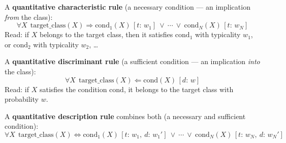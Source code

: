 \documentclass[11pt,a4paper]{article}
\theoremstyle{definition}
\begin{document}
\begin{defbox}
A \textbf{quantitative characteristic rule} (a necessary condition --- an implication \emph{from}
the class):
\[ \forall X\ \ \mathrm{target\_class}(X)\Rightarrow \mathrm{cond}_1(X)\,[t{:}\,w_1]\ \vee\
   \cdots\ \vee\ \mathrm{cond}_N(X)\,[t{:}\,w_N] \]
Read: if $X$ belongs to the target class, then it satisfies $\mathrm{cond}_1$ with typicality
$w_1$, or $\mathrm{cond}_2$ with typicality $w_2$, \dots

A \textbf{quantitative discriminant rule} (a sufficient condition --- an implication \emph{into}
the class):
\[ \forall X\ \ \mathrm{target\_class}(X)\Leftarrow \mathrm{cond}(X)\,[d{:}\,w] \]
Read: if $X$ satisfies the condition $\mathrm{cond}$, it belongs to the target class with
probability $w$.

A \textbf{quantitative description rule} combines both (a necessary and sufficient condition):
\[ \forall X\ \ \mathrm{target\_class}(X)\Leftrightarrow \mathrm{cond}_1(X)\,
   [t{:}\,w_1,\ d{:}\,w_1']\ \vee\ \cdots\ \vee\ \mathrm{cond}_N(X)\,[t{:}\,w_N,\ d{:}\,w_N'] \]
\end{defbox}
\end{document}

